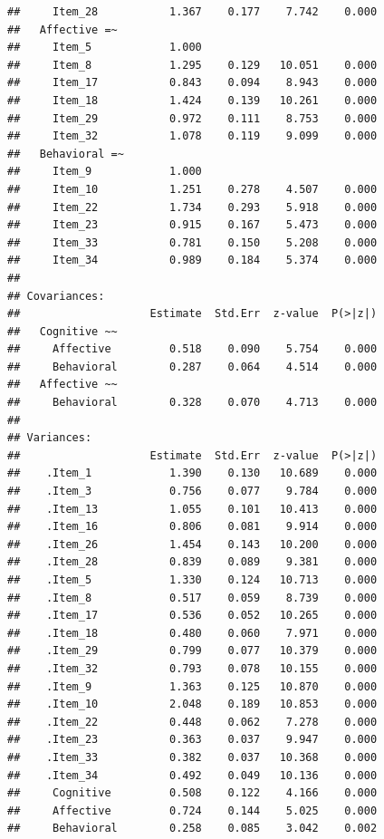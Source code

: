\documentclass[
]{book}
\begin{document}
\begin{verbatim}
##     Item_28           1.367    0.177    7.742    0.000
##   Affective =~                                        
##     Item_5            1.000                           
##     Item_8            1.295    0.129   10.051    0.000
##     Item_17           0.843    0.094    8.943    0.000
##     Item_18           1.424    0.139   10.261    0.000
##     Item_29           0.972    0.111    8.753    0.000
##     Item_32           1.078    0.119    9.099    0.000
##   Behavioral =~                                       
##     Item_9            1.000                           
##     Item_10           1.251    0.278    4.507    0.000
##     Item_22           1.734    0.293    5.918    0.000
##     Item_23           0.915    0.167    5.473    0.000
##     Item_33           0.781    0.150    5.208    0.000
##     Item_34           0.989    0.184    5.374    0.000
## 
## Covariances:
##                    Estimate  Std.Err  z-value  P(>|z|)
##   Cognitive ~~                                        
##     Affective         0.518    0.090    5.754    0.000
##     Behavioral        0.287    0.064    4.514    0.000
##   Affective ~~                                        
##     Behavioral        0.328    0.070    4.713    0.000
## 
## Variances:
##                    Estimate  Std.Err  z-value  P(>|z|)
##    .Item_1            1.390    0.130   10.689    0.000
##    .Item_3            0.756    0.077    9.784    0.000
##    .Item_13           1.055    0.101   10.413    0.000
##    .Item_16           0.806    0.081    9.914    0.000
##    .Item_26           1.454    0.143   10.200    0.000
##    .Item_28           0.839    0.089    9.381    0.000
##    .Item_5            1.330    0.124   10.713    0.000
##    .Item_8            0.517    0.059    8.739    0.000
##    .Item_17           0.536    0.052   10.265    0.000
##    .Item_18           0.480    0.060    7.971    0.000
##    .Item_29           0.799    0.077   10.379    0.000
##    .Item_32           0.793    0.078   10.155    0.000
##    .Item_9            1.363    0.125   10.870    0.000
##    .Item_10           2.048    0.189   10.853    0.000
##    .Item_22           0.448    0.062    7.278    0.000
##    .Item_23           0.363    0.037    9.947    0.000
##    .Item_33           0.382    0.037   10.368    0.000
##    .Item_34           0.492    0.049   10.136    0.000
##     Cognitive         0.508    0.122    4.166    0.000
##     Affective         0.724    0.144    5.025    0.000
##     Behavioral        0.258    0.085    3.042    0.002
\end{verbatim}
\end{document}
